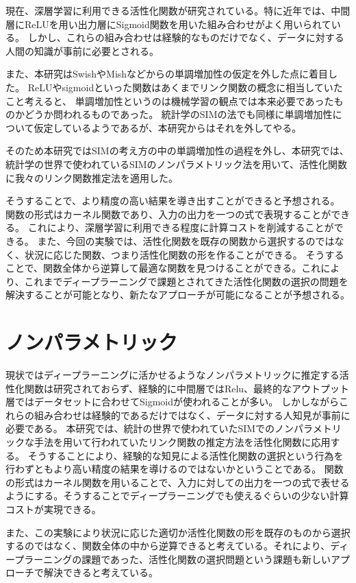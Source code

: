 現在、深層学習に利用できる活性化関数が研究されている。特に近年では、中間層にReLUを用い出力層にSigmoid関数を用いた組み合わせがよく用いられている。
しかし、これらの組み合わせは経験的なものだけでなく、データに対する人間の知識が事前に必要とされる。

また、本研究はSwishやMishなどからの単調増加性の仮定を外した点に着目した。
ReLUやsigmoidといった関数はあくまでリンク関数の概念に相当していたこと考えると、
単調増加性というのは機械学習の観点では本来必要であったものかどうか問われるものであった。
統計学のSIMの法でも同様に単調増加性について仮定しているようであるが、本研究からはそれを外してやる。

そのため本研究ではSIMの考え方の中の単調増加性の過程を外し、本研究では、統計学の世界で使われているSIMのノンパラメトリック法を用いて、活性化関数に我々のリンク関数推定法を適用した。


そうすることで、より精度の高い結果を導き出すことができると予想される。
関数の形式はカーネル関数であり、入力の出力を一つの式で表現することができる。
これにより、深層学習に利用できる程度に計算コストを削減することができる。
また、今回の実験では、活性化関数を既存の関数から選択するのではなく、状況に応じた関数、つまり活性化関数の形を作ることができる。
そうすることで、関数全体から逆算して最適な関数を見つけることができる。これにより、これまでディープラーニングで課題とされてきた活性化関数の選択の問題を解決することが可能となり、新たなアプローチが可能になることが予想される。


\section{ノンパラメトリック}


現状ではディープラーニングに活かせるようなノンパラメトリックに推定する活性化関数は研究されておらず、経験的に中間層ではRelu、最終的なアウトプット層ではデータセットに合わせてSigmoidが使われることが多い。
しかしながらこれらの組み合わせは経験的であるだけではなく、データに対する人知見が事前に必要である。
本研究では、統計の世界で使われていたSIMでのノンパラメトリックな手法を用いて行われていたリンク関数の推定方法を活性化関数に応用する。
そうすることにより、経験的な知見による活性化関数の選択という行為を行わずともより高い精度の結果を導けるのではないかということである。
関数の形式はカーネル関数を用いることで、入力に対しての出力を一つの式で表せるようにする。そうすることでディープラーニングでも使えるぐらいの少ない計算コストが実現できる。


また、この実験により状況に応じた適切か活性化関数の形を既存のものから選択するのではなく、関数全体の中から逆算できると考えている。それにより、ディープラーニングの課題であった、活性化関数の選択問題という課題も新しいアプローチで解決できると考えている。




